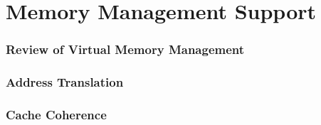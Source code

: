 \section{Memory Management Support}

\begin{frame}
    \frametitle{Review of Virtual Memory Management}
\end{frame}

\begin{frame}
    \frametitle{Address Translation}
\end{frame}

\begin{frame}
    \frametitle{Cache Coherence}
\end{frame}
